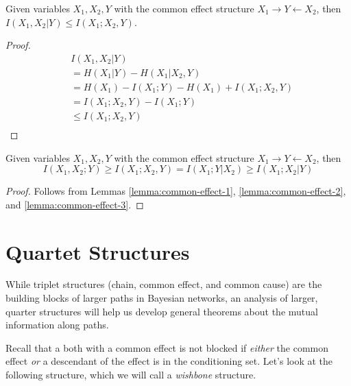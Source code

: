 \documentclass[../thesis.tex]{subfiles}
\begin{document}
\begin{lem}
  \label{lemma:common-effect-3}
  Given variables $X_1,X_2,Y$ with
  the common effect structure $X_1 \rightarrow Y \leftarrow X_2$,
  then $I(X_1,X_2 \vert Y) \leq I(X_1;X_2,Y)$.
\end{lem}
\begin{proof}
  \begin{equation}
    \begin{split}
      & I(X_1,X_2 \vert Y) \\
      & = H(X_1 \vert Y) - H(X_1 \vert X_2, Y) \\
      & = H(X_1) - I(X_1;Y) - H(X_1) + I(X_1;X_2,Y)\\
      & = I(X_1;X_2,Y) - I(X_1;Y) \\
      & \leq I(X_1;X_2,Y) \\
    \end{split}
  \end{equation}
\end{proof}

\begin{thm}
  \label{thm:common-effect-inequality}
  Given variables $X_1,X_2,Y$ with
  the common effect structure $X_1 \rightarrow Y \leftarrow X_2$, then
  $$I(X_1,X_2 ; Y) \geq I(X_1;X_2,Y) = I(X_1 ; Y \vert X_2) \geq I(X_1;X_2 \vert Y)$$
\end{thm}
\begin{proof}
  Follows from Lemmas \ref{lemma:common-effect-1},
  \ref{lemma:common-effect-2}, and \ref{lemma:common-effect-3}.
\end{proof}


\section{Quartet Structures}

While triplet structures (chain, common effect, and common cause)
are the building blocks of larger paths in Bayesian networks,
an analysis of larger, quarter structures will help us develop
general theorems about the mutual information along paths.

Recall that a both with a common effect is not blocked
if \emph{either} the common effect \emph{or} a descendant of
the effect is in the conditioning set.
Let's look at the following structure,
which we will call a \emph{wishbone} structure.

\begin{center}
\end{center}
\end{document}
